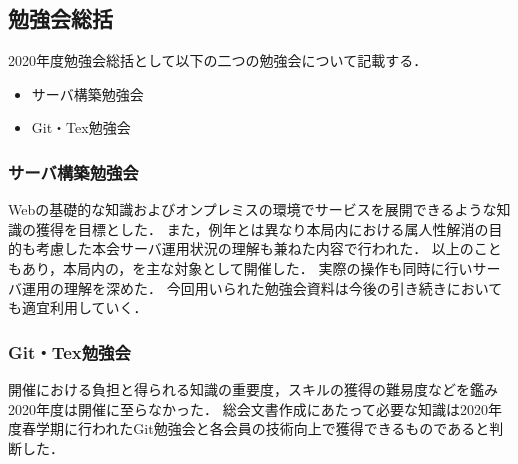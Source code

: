 \subsection*{勉強会総括}


2020年度勉強会総括として以下の二つの勉強会について記載する．
\begin{itemize}
    \item サーバ構築勉強会
    \item Git・Tex勉強会
\end{itemize}

\subsubsection*{サーバ構築勉強会}
Webの基礎的な知識およびオンプレミスの環境でサービスを展開できるような知識の獲得を目標とした．
また，例年とは異なり本局内における属人性解消の目的も考慮した本会サーバ運用状況の理解も兼ねた内容で行われた．
以上のこともあり，本局内の\firstGrade{}，\secondGrade{}を主な対象として開催した．
実際の操作も同時に行いサーバ運用の理解を深めた．
今回用いられた勉強会資料は今後の引き続きにおいても適宜利用していく．

\subsubsection*{Git・Tex勉強会}
開催における負担と得られる知識の重要度，スキルの獲得の難易度などを鑑み2020年度は開催に至らなかった．
総会文書作成にあたって必要な知識は2020年度春学期に行われたGit勉強会と各会員の技術向上で獲得できるものであると判断した．
